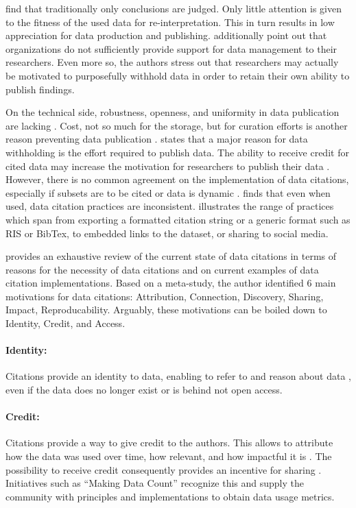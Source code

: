 \documentclass[a4paper,10pt]{article}
\begin{document}
\cite{Lawrence2011} find that traditionally only conclusions are judged. Only little attention is given to the fitness of the used data for re-interpretation. This in turn results in low appreciation for data production and publishing. \cite{Tenopir2011} additionally point out that organizations do not sufficiently provide support for data management to their researchers. Even more so, the authors stress out that researchers may actually be motivated to purposefully withhold data in order to retain their own ability to publish findings.

On the technical side, robustness, openness, and uniformity in data publication are lacking \citep{Starr2015, Koltay2016}. Cost, not so much for the storage, but for curation efforts is another reason preventing data publication \citep{Gray2002}.
\citep{Tenopir2011} states that a major reason for data withholding is the effort required to publish data. 
The ability to receive credit for cited data may increase the motivation for researchers to publish their data \citep{Crosas2011, AltKin07}. However, there is no common agreement on the implementation of data citations, especially if subsets are to be cited or data is dynamic \citep{Kratz2014, Assante2016}. \citep{Belter2014} finds that even when used, data citation practices are inconsistent. \citep{Assante2016} illustrates the range of practices which span from exporting a formatted citation string or a generic format such as RIS or BibTex, to embedded links to the dataset, or sharing to social media. 

\citep{Silvello2017} provides an exhaustive review of the current state of data citations in terms of reasons for the necessity of data citations and on current examples of data citation implementations. Based on a meta-study, the author identified 6 main motivations for data citations: Attribution, Connection, Discovery, Sharing, Impact, Reproducability. 
Arguably, these motivations can be boiled down to Identity, Credit, and Access. 

\paragraph{Identity:} 
Citations provide an identity to data, enabling to refer to and reason about data \citep{Bandrowski2016}, even if the data does no longer exist or is behind not open access.

\paragraph{Credit:}
Citations provide a way to give credit to the authors. This allows to attribute how the data was used over time, how relevant, and how impactful it is \citep{Honor2016}. The possibility to receive credit consequently provides an incentive for sharing \citep{Niemeyer2016, Callaghan2012, Kratz2014}. Initiatives such as ``Making Data Count''\citep{Kratz2015} recognize this and supply the community with principles and implementations to obtain data usage metrics.
\end{document}
